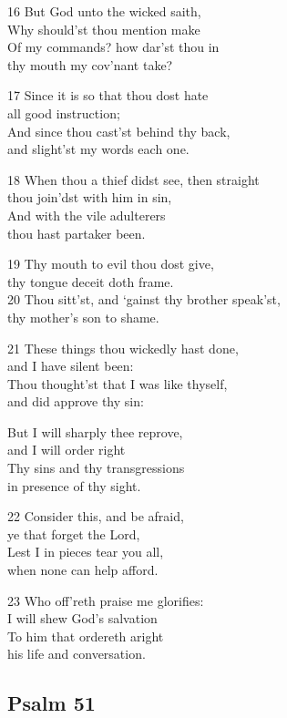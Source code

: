 16 But God unto the wicked saith,\\
Why should’st thou mention make\\
Of my commands? how dar’st thou in\\
thy mouth my cov’nant take?

17 Since it is so that thou dost hate\\
all good instruction;\\
And since thou cast’st behind thy back,\\
and slight’st my words each one.

18 When thou a thief didst see, then straight\\
thou join’dst with him in sin,\\
And with the vile adulterers\\
thou hast partaker been.

19 Thy mouth to evil thou dost give,\\
thy tongue deceit doth frame.\\
20 Thou sitt’st, and ‘gainst thy brother speak’st,\\
thy mother’s son to shame.

21 These things thou wickedly hast done,\\
and I have silent been:\\
Thou thought’st that I was like thyself,\\
and did approve thy sin:

But I will sharply thee reprove,\\
and I will order right\\
Thy sins and thy transgressions\\
in presence of thy sight.

22 Consider this, and be afraid,\\
ye that forget the Lord,\\
Lest I in pieces tear you all,\\
when none can help afford.

23 Who off’reth praise me glorifies:\\
I will shew God’s salvation\\
To him that ordereth aright\\
his life and conversation.

\begin{center}
\quad{}\quad{}
\end{center}

\subsection*{Psalm 51}

